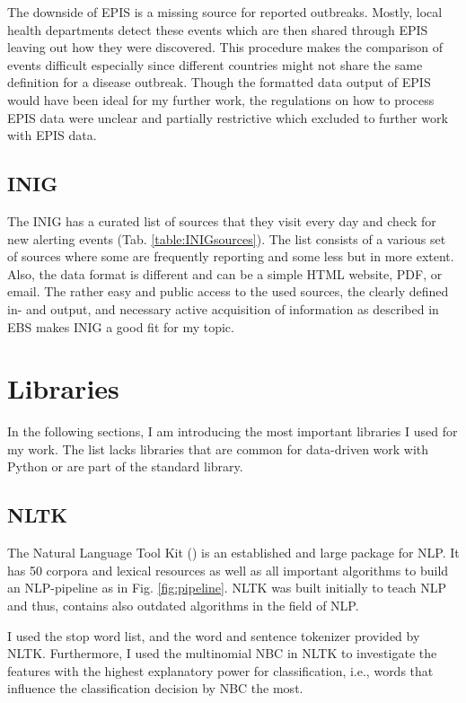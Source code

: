   The downside of EPIS is a missing source for reported outbreaks.
  Mostly, local health departments detect these events which are then shared through EPIS leaving out how they were discovered.
  This procedure makes the comparison of events difficult especially since different countries might not share the same definition for a disease outbreak.
  Though the formatted data output of EPIS would have been ideal for my further work, the regulations on how to process EPIS data were unclear and partially restrictive which excluded to further work with EPIS data.

\subsection{INIG}\label{INIGsources}
  The INIG has a curated list of sources that they visit every day and check for new alerting events (Tab. \ref{table:INIGsources}).
  The list consists of a various set of sources where some are frequently reporting and some less but in more extent.
  Also, the data format is different and can be a simple HTML website, PDF, or email.
  The rather easy and public access to the used sources, the clearly defined in- and output, and necessary active acquisition of information as described in EBS makes INIG a good fit for my topic.

\section{Libraries}
  In the following sections, I am introducing the most important libraries I used for my work.
  The list lacks libraries that are common for data-driven work with Python or are part of the standard library.

\subsection{NLTK}
  The Natural Language Tool Kit () is an established and large package for NLP.
  It has 50 corpora and lexical resources as well as all important algorithms to build an NLP-pipeline as in Fig. \ref{fig:pipeline}.
  NLTK was built initially to teach NLP and thus, contains also outdated algorithms in the field of NLP.

  I used the stop word list, and the word and sentence tokenizer provided by NLTK.
  Furthermore, I used the multinomial NBC in NLTK to investigate the features with the highest explanatory power for classification, i.e., words that influence the classification decision by NBC the most.


